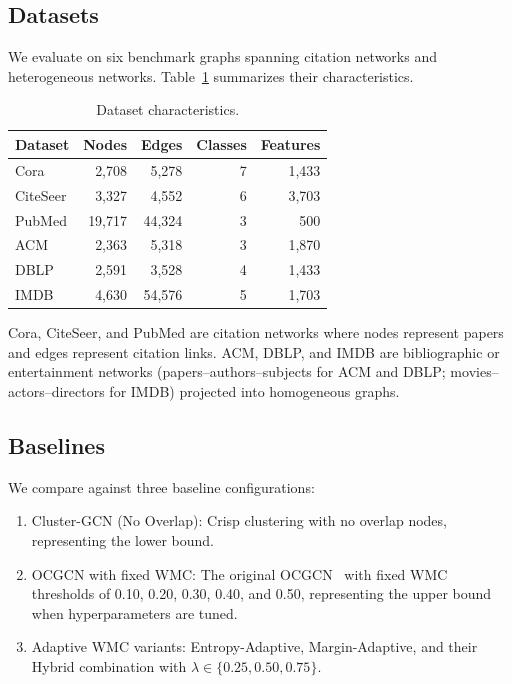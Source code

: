 \documentclass[pdflatex,sn-mathphys-num]{sn-jnl}%
\theoremstyle{thmstyleone}%
\theoremstyle{thmstyletwo}%
\theoremstyle{thmstylethree}%
\begin{document}
\subsection{Datasets}
\label{subsec:datasets}

We evaluate on six benchmark graphs spanning citation networks and heterogeneous networks.
Table~\ref{tab:datasets} summarizes their characteristics.

\begin{table}[ht]
\centering
\caption{Dataset characteristics.}
\label{tab:datasets}
\begin{tabular}{lrrrr}
\toprule
\textbf{Dataset} & \textbf{Nodes} & \textbf{Edges} & \textbf{Classes} & \textbf{Features} \\
\midrule
Cora & 2,708 & 5,278 & 7 & 1,433 \\
CiteSeer & 3,327 & 4,552 & 6 & 3,703 \\
PubMed & 19,717 & 44,324 & 3 & 500 \\
ACM & 2,363 & 5,318 & 3 & 1,870 \\
DBLP & 2,591 & 3,528 & 4 & 1,433 \\
IMDB & 4,630 & 54,576 & 5 & 1,703 \\
\bottomrule
\end{tabular}
\end{table}

Cora, CiteSeer, and PubMed are citation networks where nodes represent papers and edges represent citation links.
ACM, DBLP, and IMDB are bibliographic or entertainment networks (papers--authors--subjects for ACM and DBLP; movies--actors--directors for IMDB) projected into homogeneous graphs.

\subsection{Baselines}
\label{subsec:baselines}

We compare against three baseline configurations:

\begin{enumerate}
  \item {Cluster-GCN (No Overlap):} Crisp clustering with no overlap nodes, representing the lower bound.
  \item {OCGCN with fixed WMC:} The original OCGCN~\citep{Amintoosi2021} with fixed WMC thresholds of 0.10, 0.20, 0.30, 0.40, and 0.50, representing the upper bound when hyperparameters are tuned.
  \item {Adaptive WMC variants:} Entropy-Adaptive, Margin-Adaptive, and their Hybrid combination with $\lambda \in \{0.25, 0.50, 0.75\}$.
\end{enumerate}
\end{document}
